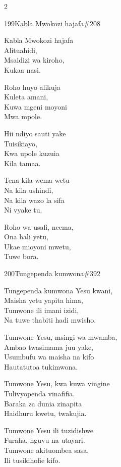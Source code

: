 \documentclass{article}
\begin{document}
\begin{multicols}{2}
\begin{hymn}{199}{Kabla Mwokozi hajafa}{\#208}
\begin{stanza}
Kabla Mwokozi hajafa\\
Alituahidi,\\
Msaidizi wa kiroho,\\
Kukaa nasi.
\end{stanza}
\begin{stanza}
Roho huyo alikuja\\
Kuleta amani,\\
Kuwa mgeni moyoni\\
Mwa mpole.
\end{stanza}
\begin{stanza}
Hii ndiyo sauti yake\\
Tuisikiayo,\\
Kwa upole kuzuia\\
Kila tamaa.
\end{stanza}
\begin{stanza}
Tena kila wema wetu\\
Na kila ushindi,\\
Na kila wazo la sifa\\
Ni vyake tu.
\end{stanza}
\begin{stanza}
Roho wa usafi, neema,\\
Ona hali yetu,\\
Ukae mioyoni mwetu,\\
Tuwe bora.
\end{stanza}
\end{hymn}

\begin{hymn}{200}{Tungependa kumwona}{\#392}
\begin{stanza}
Tungependa kumwona Yesu kwani,\\
Maisha yetu yapita hima,\\
Tumwone ili imani izidi,\\
Na tuwe thabiti hadi mwisho.
\end{stanza}
\begin{stanza}
Tumwone Yesu, msingi wa mwamba,\\
Ambao twasimama juu yake,\\
Usumbufu wa maisha na kifo\\
Hautatutoa tukimwona.
\end{stanza}
\begin{stanza}
Tumwone Yesu, kwa kuwa vingine\\
Tulivyopenda vinafifia.\\
Baraka za dunia zinapita\\
Haidhuru kwetu, twakujia.
\end{stanza}
\begin{stanza}
Tumwone Yesu ili tuzidishwe\\
Furaha, nguvu na utayari.\\
Tumwone akituombea sasa,\\
Ili tusikihofie kifo.
\end{stanza}
\end{hymn}


\end{multicols}
\end{document}
